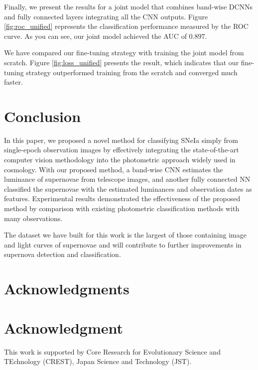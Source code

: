 \documentclass[conference,compsoc]{IEEEtran}
\begin{document}
  Finally, we present the results for a joint model that combines band-wise DCNNs and fully connected layers integrating all the CNN outputs.
  Figure \ref{fig:roc_unified} represents the classification performance measured by the ROC curve. %
  As you can see, our joint model achieved the AUC of $0.897$.

  We have compared our fine-tuning strategy with training the joint model from scratch.
  Figure \ref{fig:loss_unified} presents the result, which indicates that our fine-tuning strategy outperformed training from the scratch and converged much faster.




\section{Conclusion}
\label{sec:conclude}

  In this paper, we proposed a novel method for classifying SNeIa simply from single-epoch observation images by effectively integrating the state-of-the-art computer vision methodology into the photometric approach widely used in cosmology.
  With our proposed method, a band-wise CNN estimates the luminance of supernovae from telescope images, and another fully connected NN classified the supernovae with the estimated luminances and observation dates as features.
  Experimental results demonstrated the effectiveness of the proposed method by comparison with existing photometric classification methods with many observations.

  The dataset we have built for this work is the largest of those containing image and light curves of supernovae and will contribute to further improvements in supernova detection and classification.



\ifCLASSOPTIONcompsoc
  \section*{Acknowledgments}
\else
  \section*{Acknowledgment}
\fi

  This work is supported by Core Research for Evolutionary Science and TEchnology (CREST), Japan Science and Technology (JST).




\end{document}
